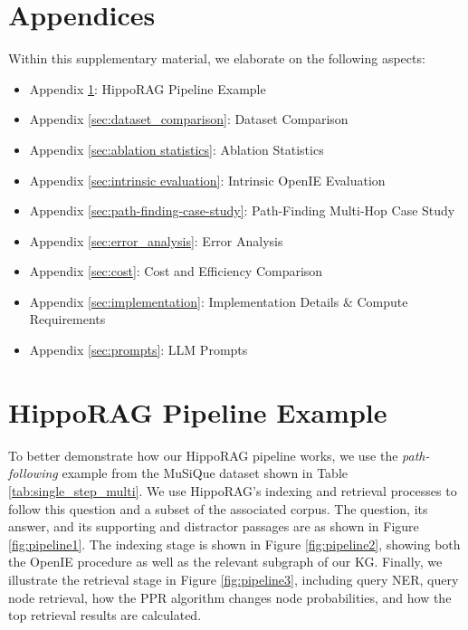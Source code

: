 \documentclass{article}
\begin{document}


% 
%  


\clearpage
\begin{appendices}
\section*{Appendices}

Within this supplementary material, we elaborate on the following aspects:

\begin{itemize}
    \item Appendix \ref{sec:method_example}: HippoRAG Pipeline Example
    \item Appendix \ref{sec:dataset_comparison}: Dataset Comparison
    \item Appendix \ref{sec:ablation statistics}: Ablation Statistics
    \item Appendix \ref{sec:intrinsic evaluation}: Intrinsic OpenIE Evaluation
    \item Appendix \ref{sec:path-finding-case-study}: Path-Finding Multi-Hop Case Study
    \item Appendix \ref{sec:error_analysis}: Error Analysis
    \item Appendix \ref{sec:cost}: Cost and Efficiency Comparison
    \item Appendix \ref{sec:implementation}: Implementation Details \& Compute Requirements
    \item Appendix \ref{sec:prompts}: LLM Prompts
\end{itemize}

\clearpage


\section{HippoRAG Pipeline Example}
\label{sec:method_example}

To better demonstrate how our HippoRAG pipeline works, we use the \textit{path-following} example from the MuSiQue dataset shown in Table \ref{tab:single_step_multi}. 
We use HippoRAG's indexing and retrieval processes to follow this question and a subset of the associated corpus.
The question, its answer, and its supporting and distractor passages are as shown in Figure \ref{fig:pipeline1}. The indexing stage is shown in Figure \ref{fig:pipeline2}, showing both the OpenIE procedure as well as the relevant subgraph of our KG. 
Finally, we illustrate the retrieval stage in Figure \ref{fig:pipeline3}, including query NER, query node retrieval, how the PPR algorithm changes node probabilities, and how the top retrieval results are calculated.


\end{appendices}
\end{document}
